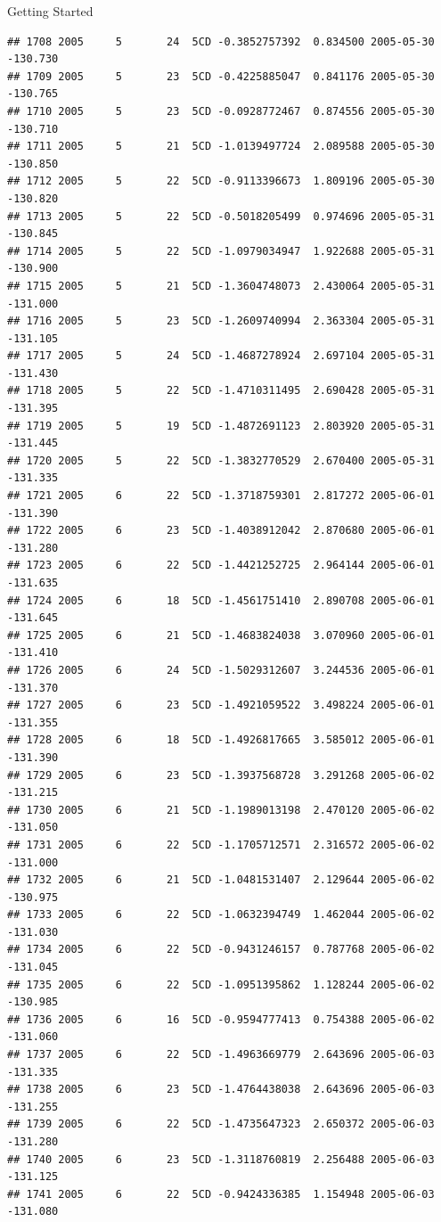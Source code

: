 \documentclass[
  ignorenonframetext,
]{beamer}
\begin{document}
\begin{frame}[fragile]{Getting Started}
\begin{verbatim}
## 1708 2005     5       24  5CD -0.3852757392  0.834500 2005-05-30 -130.730
## 1709 2005     5       23  5CD -0.4225885047  0.841176 2005-05-30 -130.765
## 1710 2005     5       23  5CD -0.0928772467  0.874556 2005-05-30 -130.710
## 1711 2005     5       21  5CD -1.0139497724  2.089588 2005-05-30 -130.850
## 1712 2005     5       22  5CD -0.9113396673  1.809196 2005-05-30 -130.820
## 1713 2005     5       22  5CD -0.5018205499  0.974696 2005-05-31 -130.845
## 1714 2005     5       22  5CD -1.0979034947  1.922688 2005-05-31 -130.900
## 1715 2005     5       21  5CD -1.3604748073  2.430064 2005-05-31 -131.000
## 1716 2005     5       23  5CD -1.2609740994  2.363304 2005-05-31 -131.105
## 1717 2005     5       24  5CD -1.4687278924  2.697104 2005-05-31 -131.430
## 1718 2005     5       22  5CD -1.4710311495  2.690428 2005-05-31 -131.395
## 1719 2005     5       19  5CD -1.4872691123  2.803920 2005-05-31 -131.445
## 1720 2005     5       22  5CD -1.3832770529  2.670400 2005-05-31 -131.335
## 1721 2005     6       22  5CD -1.3718759301  2.817272 2005-06-01 -131.390
## 1722 2005     6       23  5CD -1.4038912042  2.870680 2005-06-01 -131.280
## 1723 2005     6       22  5CD -1.4421252725  2.964144 2005-06-01 -131.635
## 1724 2005     6       18  5CD -1.4561751410  2.890708 2005-06-01 -131.645
## 1725 2005     6       21  5CD -1.4683824038  3.070960 2005-06-01 -131.410
## 1726 2005     6       24  5CD -1.5029312607  3.244536 2005-06-01 -131.370
## 1727 2005     6       23  5CD -1.4921059522  3.498224 2005-06-01 -131.355
## 1728 2005     6       18  5CD -1.4926817665  3.585012 2005-06-01 -131.390
## 1729 2005     6       23  5CD -1.3937568728  3.291268 2005-06-02 -131.215
## 1730 2005     6       21  5CD -1.1989013198  2.470120 2005-06-02 -131.050
## 1731 2005     6       22  5CD -1.1705712571  2.316572 2005-06-02 -131.000
## 1732 2005     6       21  5CD -1.0481531407  2.129644 2005-06-02 -130.975
## 1733 2005     6       22  5CD -1.0632394749  1.462044 2005-06-02 -131.030
## 1734 2005     6       22  5CD -0.9431246157  0.787768 2005-06-02 -131.045
## 1735 2005     6       22  5CD -1.0951395862  1.128244 2005-06-02 -130.985
## 1736 2005     6       16  5CD -0.9594777413  0.754388 2005-06-02 -131.060
## 1737 2005     6       22  5CD -1.4963669779  2.643696 2005-06-03 -131.335
## 1738 2005     6       23  5CD -1.4764438038  2.643696 2005-06-03 -131.255
## 1739 2005     6       22  5CD -1.4735647323  2.650372 2005-06-03 -131.280
## 1740 2005     6       23  5CD -1.3118760819  2.256488 2005-06-03 -131.125
## 1741 2005     6       22  5CD -0.9424336385  1.154948 2005-06-03 -131.080

\end{verbatim}
\end{frame}
\end{document}
